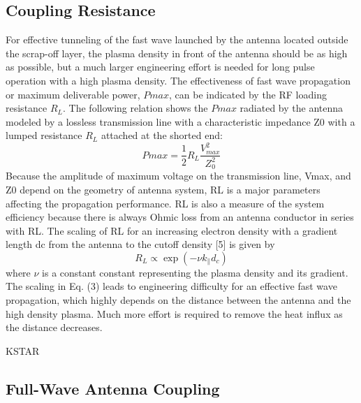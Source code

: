 \subsection{Coupling Resistance}
For effective tunneling of the fast wave launched
by the antenna located outside the scrap-off layer, the
plasma density in front of the antenna should be as high
as possible, but a much larger engineering effort is needed
for long pulse operation with a high plasma density. The
effectiveness of fast wave propagation or maximum deliverable
power, $Pmax$, can be indicated by the RF loading
resistance $R_L$. The following relation shows the $Pmax$ radiated
by the antenna modeled by a lossless transmission
line with a characteristic impedance Z0 with a lumped
resistance $R_L$ attached at the shorted end:
\begin{equation}
	Pmax = \frac{1}{2} R_L \frac{V^2_{max}}{Z_0^2}
\end{equation}
Because the amplitude of maximum voltage on the transmission
line, Vmax, and Z0 depend on the geometry of
antenna system, RL is a major parameters affecting the
propagation performance. RL is also a measure of the
system efficiency because there is always Ohmic loss from
an antenna conductor in series with RL.
The scaling of RL for an increasing electron density
with a gradient length dc from the antenna to the cutoff
density [5] is given by
\begin{equation}
	R_L \propto \exp\left(- \nu k_\parallel d_c \right)
\end{equation}
where $\nu$ is a constant constant representing the plasma density and
its gradient. The scaling in Eq. (3) leads to engineering
difficulty for an effective fast wave propagation, which
highly depends on the distance between the antenna and
the high density plasma. Much more effort is required
to remove the heat influx as the distance decreases.

KSTAR 


\subsection{Full-Wave Antenna Coupling}\label{sec:ICRH_FW_antena_coupling}





